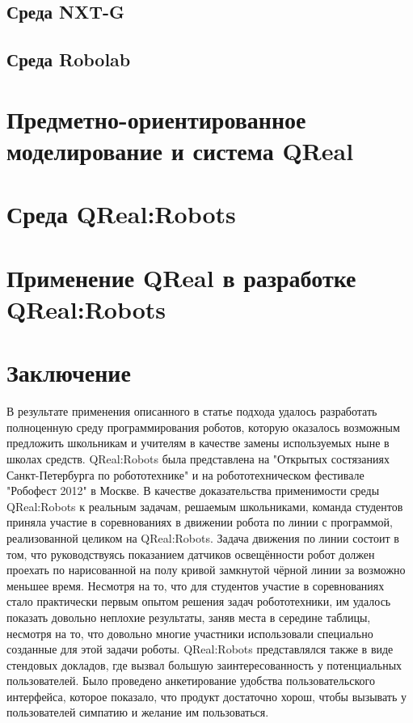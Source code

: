 \documentclass[a4paper]{article}
\begin{document}
\subsection{Среда NXT-G}

\subsection{Среда Robolab}

\section{Предметно-ориентированное моделирование и система QReal}

\section{Среда QReal:Robots}

\section{Применение QReal в разработке QReal:Robots}

\section*{Заключение}
В результате применения описанного в статье подхода удалось разработать полноценную среду программирования роботов, которую оказалось возможным предложить школьникам и учителям в качестве замены используемых ныне в школах средств. QReal:Robots была представлена на "Открытых состязаниях Санкт-Петербурга по робототехнике" и на робототехническом фестивале "Робофест 2012" в Москве. В качестве доказательства применимости среды QReal:Robots к реальным задачам, решаемым школьниками, команда студентов приняла участие в соревнованиях в движении робота по линии с программой, реализованной целиком на QReal:Robots. Задача движения по линии состоит в том, что руководствуясь показанием датчиков освещённости робот должен проехать по нарисованной на полу кривой замкнутой чёрной линии за возможно меньшее время. Несмотря на то, что для студентов участие в соревнованиях стало практически первым опытом решения задач робототехники, им удалось показать довольно неплохие результаты, заняв места в середине таблицы, несмотря на то, что довольно многие участники использовали специально созданные для этой задачи роботы. QReal:Robots представлялся также в виде стендовых докладов, где вызвал большую заинтересованность у потенциальных пользователей. Было проведено анкетирование удобства пользовательского интерфейса, которое показало, что продукт достаточно хорош, чтобы вызывать у пользователей симпатию и желание им пользоваться.
\end{document}
